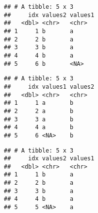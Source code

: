 \documentclass[krantz2]{krantz}\usepackage{knitr}
\begin{document}
\begin{knitrout}\footnotesize
{}\color{fgcolor}\begin{kframe}
\begin{alltt}
\hlstd{(}   
\end{alltt}


{\ttfamily\noindent\itshape\color{messagecolor}{\#\# Joining with `by = join\_by(idx)`}}\begin{verbatim}
## # A tibble: 5 x 3
##     idx values2 values1
##   <dbl> <chr>   <chr>  
## 1     1 b       a      
## 2     2 b       a      
## 3     3 b       a      
## 4     4 b       a      
## 5     6 b       <NA>
\end{verbatim}
\end{kframe}
\end{knitrout}

\begin{knitrout}\footnotesize
{}\color{fgcolor}\begin{kframe}
\begin{alltt}
\hlstd{(}   
\end{alltt}


{\ttfamily\noindent\itshape\color{messagecolor}{\#\# Joining with `by = join\_by(idx)`}}\begin{verbatim}
## # A tibble: 5 x 3
##     idx values1 values2
##   <dbl> <chr>   <chr>  
## 1     1 a       b      
## 2     2 a       b      
## 3     3 a       b      
## 4     4 a       b      
## 5     6 <NA>    b
\end{verbatim}
\end{kframe}
\end{knitrout}

\begin{knitrout}\footnotesize
{}\color{fgcolor}\begin{kframe}
\begin{alltt}
\hlstd{(}   
\end{alltt}


{\ttfamily\noindent\itshape\color{messagecolor}{\#\# Joining with `by = join\_by(idx)`}}\begin{verbatim}
## # A tibble: 5 x 3
##     idx values2 values1
##   <dbl> <chr>   <chr>  
## 1     1 b       a      
## 2     2 b       a      
## 3     3 b       a      
## 4     4 b       a      
## 5     5 <NA>    a
\end{verbatim}
\end{kframe}
\end{knitrout}
\end{document}
